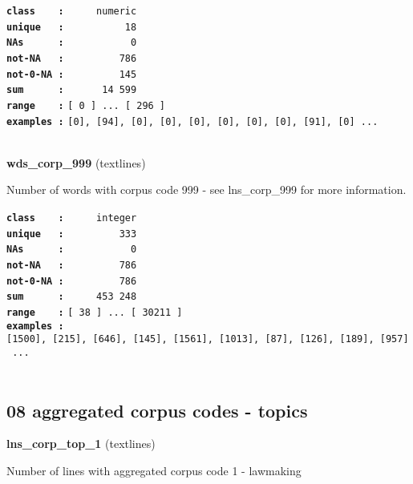 \documentclass[]{article}
\begin{document}
\textbf{\texttt{class\ \ \ \ :}} \texttt{~~~~~numeric}\\
\textbf{\texttt{unique\ \ \ :}} \texttt{~~~~~~~~~~18}\\
\textbf{\texttt{NAs\ \ \ \ \ \ :}} \texttt{~~~~~~~~~~~0}\\
\textbf{\texttt{not-NA\ \ \ :}} \texttt{~~~~~~~~~786}\\
\textbf{\texttt{not-0-NA\ :}} \texttt{~~~~~~~~~145}\\
\textbf{\texttt{sum\ \ \ \ \ \ :}} \texttt{~~~~~~14~599}\\
\textbf{\texttt{range\ \ \ \ :}}
\texttt{{[}\ 0\ {]}\ ...\ {[}\ 296\ {]}}\\
\textbf{\texttt{examples\ :}}
\texttt{{[}0{]},\ {[}94{]},\ {[}0{]},\ {[}0{]},\ {[}0{]},\ {[}0{]},\ {[}0{]},\ {[}0{]},\ {[}91{]},\ {[}0{]}\ ...}\\

~

\textbf{wds\_corp\_999} (textlines)

Number of words with corpus code 999 - see lns\_corp\_999 for more
information.

\textbf{\texttt{class\ \ \ \ :}} \texttt{~~~~~integer}\\
\textbf{\texttt{unique\ \ \ :}} \texttt{~~~~~~~~~333}\\
\textbf{\texttt{NAs\ \ \ \ \ \ :}} \texttt{~~~~~~~~~~~0}\\
\textbf{\texttt{not-NA\ \ \ :}} \texttt{~~~~~~~~~786}\\
\textbf{\texttt{not-0-NA\ :}} \texttt{~~~~~~~~~786}\\
\textbf{\texttt{sum\ \ \ \ \ \ :}} \texttt{~~~~~453~248}\\
\textbf{\texttt{range\ \ \ \ :}}
\texttt{{[}\ 38\ {]}\ ...\ {[}\ 30211\ {]}}\\
\textbf{\texttt{examples\ :}}
\texttt{{[}1500{]},\ {[}215{]},\ {[}646{]},\ {[}145{]},\ {[}1561{]},\ {[}1013{]},\ {[}87{]},\ {[}126{]},\ {[}189{]},\ {[}957{]}\ ...}\\

~

\subsection{08 aggregated corpus codes -
topics}\label{aggregated-corpus-codes---topics}

\textbf{lns\_corp\_top\_1} (textlines)

Number of lines with aggregated corpus code 1 - lawmaking
\end{document}
